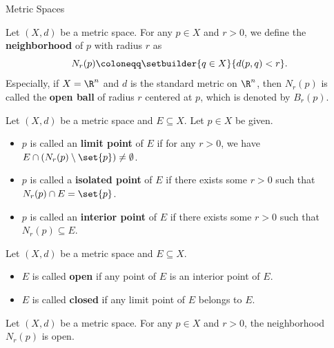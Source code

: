 \begin{section}{Metric Spaces}
\bigskip

\begin{definition} \label{def:NeighborhoodOpenBall}
    Let $(X, d)$ be a metric space. For any $p \in X$ and $r > 0$,
    we define the \textbf{neighborhood} of $p$ with radius $r$ as
    \[
    N_{r}(p) \coloneqq \setbuilder{q \in X}{d(p, q) < r}.
    \]
    Especially, if $X = \R^{n}$ and $d$ is the standard metric on $\R^{n}$, then $N_{r}(p)$ is called the
    \textbf{open ball} of radius $r$ centered at $p$, which is denoted by $B_{r}(p)$.
\end{definition}

\bigskip

\begin{definition} \label{def:LimitIsolatedInteriorPoints}
    Let $(X, d)$ be a metric space and $E \subseteq X$. Let $p \in X$ be given.
    \begin{itemize}
        \item $p$ is called an \textbf{limit point} of $E$
        if for any $r > 0$, we have $E \cap (N_{r}(p) \setminus \set{p}) \neq \emptyset$.
        \item $p$ is called a \textbf{isolated point} of $E$
        if there exists some $r > 0$ such that $N_{r}(p) \cap E = \set{p}$.
        \item $p$ is called an \textbf{interior point} of $E$
        if there exists some $r > 0$ such that $N_{r}(p) \subseteq E$.
    \end{itemize}
\end{definition}

\bigskip

\begin{definition} \label{def:OpenClosedSets}
    Let $(X, d)$ be a metric space and $E \subseteq X$.
    \begin{itemize}
        \item $E$ is called \textbf{open} if any point of $E$ is an interior point of $E$.
        \item $E$ is called \textbf{closed} if any limit point of $E$ belongs to $E$.
    \end{itemize}
\end{definition}

\bigskip

\begin{theorem} \label{thm:NeighborhoodIsOpen}
    Let $(X, d)$ be a metric space. For any $p \in X$ and $r > 0$, the neighborhood $N_{r}(p)$ is open.
\end{theorem}


\end{section}
